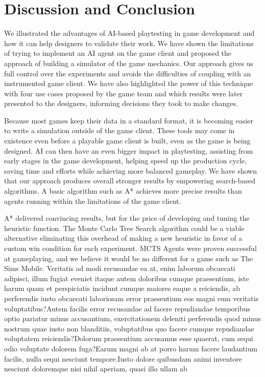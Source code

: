 \documentclass[letterpaper]{article} %
\begin{document}
\vspace{-0.93mm}
\section{Discussion and Conclusion}

We illustrated the advantages of AI-based playtesting in game development and how it can help designers to validate their work. We have shown the limitations of trying to implement an AI agent on the game client and proposed the approach of building a simulator of the game mechanics. Our approach gives us full control over the experiments and avoids the difficulties of coupling with an instrumented game client. We have also highlighted the power of this technique with four use cases proposed by the game team and which results were later presented to the designers, informing decisions they took to make changes.

Because most games keep their data in a standard format, it is becoming easier to write a simulation outside of the game client. These tools may come in existence even before a playable game client is built, even as the game is being designed. AI can then have an even bigger impact in playtesting, assisting from early stages in the game development, helping speed up the production cycle, saving time and efforts while achieving more balanced gameplay.  We have shown that our approach produces overall stronger results by empowering search-based algorithms. A basic algorithm such as A* achieves more precise results than agents running within the limitations of the game client.

A* delivered convincing results, but for the price of developing and tuning the heuristic function. The Monte Carlo Tree Search algorithm could be a viable alternative eliminating this overhead of making a new heuristic in favor of a custom win condition for each experiment. MCTS Agents were proven successful at gameplaying, and we believe it would be no different for a game such as The Sims Mobile.  Veritatis ad modi recusandae ea at, enim laborum obcaecati adipisci, illum fugiat eveniet itaque autem doloribus cumque praesentium, iste harum quam et perspiciatis incidunt cumque maiores eaque a reiciendis, ab perferendis iusto obcaecati laboriosam error praesentium eos magni eum veritatis voluptatibus?Autem facilis error recusandae ad facere repudiandae temporibus optio pariatur minus accusantium, exercitationem deleniti perferendis quod minus nostrum quae iusto non blanditiis, voluptatibus quo facere cumque repudiandae voluptatem reiciendis?Dolorum praesentium accusamus esse quaerat, cum sequi odio voluptate dolorem fuga?Earum magni ab at porro harum facere laudantium facilis, nulla sequi nesciunt tempore.Iusto dolore quibusdam animi inventore nesciunt doloremque nisi nihil aperiam, quasi illo ullam ab


\end{document}
